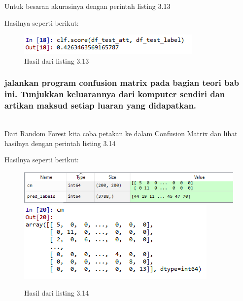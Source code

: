 Untuk besaran akurasinya dengan perintah listing 3.13

Hasilnya seperti berikut:
\begin{figure}[H]
	\centering
	\includegraphics{figures/1174083/figures3/22.png}
	\caption{Hasil dari listing 3.13}
\end{figure}

\subsubsection{jalankan program confusion matrix pada bagian teori bab ini. Tunjukkan keluarannya dari komputer sendiri dan artikan maksud setiap luaran yang didapatkan.}
\hfill\\
Dari Random Forest kita coba petakan ke dalam Confusion Matrix dan lihat hasilnya dengan perintah listing 3.14

Hasilnya seperti berikut:
\begin{figure}[H]
	\centering
	\includegraphics[width=12cm]{figures/1174083/figures3/23.png}
	\includegraphics{figures/1174083/figures3/23a.png}
	\caption{Hasil dari listing 3.14}
\end{figure}

